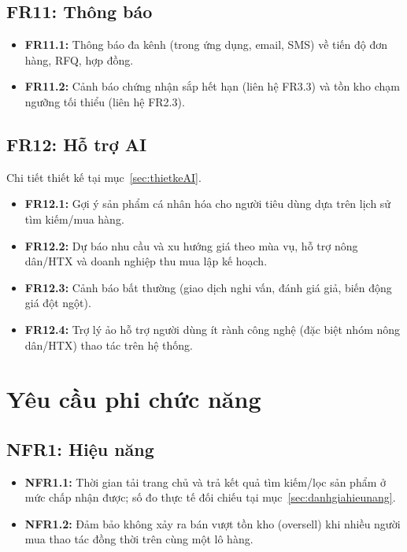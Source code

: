 \subsection{FR11: Thông báo}
\begin{itemize}
    \item \textbf{FR11.1:} Thông báo đa kênh (trong ứng dụng, email, SMS)
    về tiến độ đơn hàng, RFQ, hợp đồng.
    \item \textbf{FR11.2:} Cảnh báo chứng nhận sắp hết hạn (liên hệ FR3.3)
    và tồn kho chạm ngưỡng tối thiểu (liên hệ FR2.3).
\end{itemize}

\subsection{FR12: Hỗ trợ AI}
\label{subsec:FR-AI}
Chi tiết thiết kế tại mục~\ref{sec:thietkeAI}.
\begin{itemize}
    \item \textbf{FR12.1:} Gợi ý sản phẩm cá nhân hóa cho người tiêu dùng
    dựa trên lịch sử tìm kiếm/mua hàng.
    \item \textbf{FR12.2:} Dự báo nhu cầu và xu hướng giá theo mùa vụ, hỗ
    trợ nông dân/HTX và doanh nghiệp thu mua lập kế hoạch.
    \item \textbf{FR12.3:} Cảnh báo bất thường (giao dịch nghi vấn, đánh
    giá giả, biến động giá đột ngột).
    \item \textbf{FR12.4:} Trợ lý ảo hỗ trợ người dùng ít rành công nghệ
    (đặc biệt nhóm nông dân/HTX) thao tác trên hệ thống.
\end{itemize}

\section{Yêu cầu phi chức năng}
\label{sec:yeucauphichucnang}

\subsection{NFR1: Hiệu năng}
\begin{itemize}
    \item \textbf{NFR1.1:} Thời gian tải trang chủ và trả kết quả tìm
    kiếm/lọc sản phẩm ở mức chấp nhận được; số đo thực tế đối chiếu tại
    mục~\ref{sec:danhgiahieunang}.
    \item \textbf{NFR1.2:} Đảm bảo không xảy ra bán vượt tồn kho (oversell)
    khi nhiều người mua thao tác đồng thời trên cùng một lô hàng.
\end{itemize}

